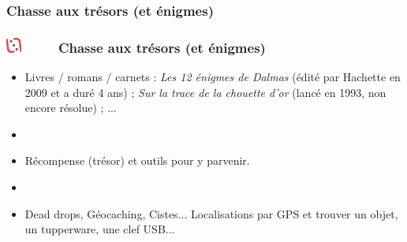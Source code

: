 \documentclass[slidetop,11pt]{beamer}
\def\moreInFrameTitleLeftt{\includegraphics[height=0.5cm]{img/ligueludique-0.png}~~~~~}
\begin{document}
\def\sectionPartIIbII{Chasse aux tr{\'e}sors (et {\'e}nigmes)}
\subsubsection{\sectionPartIIbII} %
\begin{frame}
	\frametitle{\moreInFrameTitleLeftt \sectionPartIIbII }
	\begin{itemize}
		\item Livres / romans / carnets : \emph{Les 12 {\'e}nigmes de Dalmas} ({\'e}dit{\'e} par Hachette en 2009 et a dur{\'e} 4 ans) ; \emph{Sur la trace de la chouette d'or} (lanc{\'e} en 1993, non encore r{\'e}solue) ; ...
		\item[] 
		\item R{\'e}compense (tr{\'e}sor) et outils pour y parvenir. 
		\item[]  
		\item Dead drops, G{\'e}ocaching, Cistes... Localisations par GPS et trouver un objet, un tupperware, une clef USB...
	\end{itemize}
\end{frame} 

\def\sectionPartIIbIII{La curiosit{\'e} (et le reste) : deux groupes}
\end{document}
